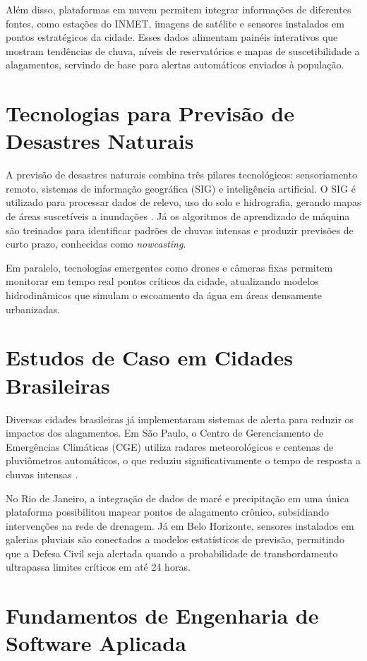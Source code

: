 Além disso, plataformas em nuvem permitem integrar informações de diferentes fontes, como estações do INMET, imagens de satélite e sensores instalados em pontos estratégicos da cidade. Esses dados alimentam painéis interativos que mostram tendências de chuva, níveis de reservatórios e mapas de suscetibilidade a alagamentos, servindo de base para alertas automáticos enviados à população.

\section{Tecnologias para Previsão de Desastres Naturais}

A previsão de desastres naturais combina três pilares tecnológicos: sensoriamento remoto, sistemas de informação geográfica (SIG) e inteligência artificial. O SIG é utilizado para processar dados de relevo, uso do solo e hidrografia, gerando mapas de áreas suscetíveis a inundações \cite{carvalho2025sistema}. Já os algoritmos de aprendizado de máquina são treinados para identificar padrões de chuvas intensas e produzir previsões de curto prazo, conhecidas como \textit{nowcasting}.  

Em paralelo, tecnologias emergentes como drones e câmeras fixas permitem monitorar em tempo real pontos críticos da cidade, atualizando modelos hidrodinâmicos que simulam o escoamento da água em áreas densamente urbanizadas.

\section{Estudos de Caso em Cidades Brasileiras}

Diversas cidades brasileiras já implementaram sistemas de alerta para reduzir os impactos dos alagamentos. Em São Paulo, o Centro de Gerenciamento de Emergências Climáticas (CGE) utiliza radares meteorológicos e centenas de pluviômetros automáticos, o que reduziu significativamente o tempo de resposta a chuvas intensas \cite{domingos2025mapeamento}.  

No Rio de Janeiro, a integração de dados de maré e precipitação em uma única plataforma possibilitou mapear pontos de alagamento crônico, subsidiando intervenções na rede de drenagem. Já em Belo Horizonte, sensores instalados em galerias pluviais são conectados a modelos estatísticos de previsão, permitindo que a Defesa Civil seja alertada quando a probabilidade de transbordamento ultrapassa limites críticos em até 24 horas.

\section{Fundamentos de Engenharia de Software Aplicada}


